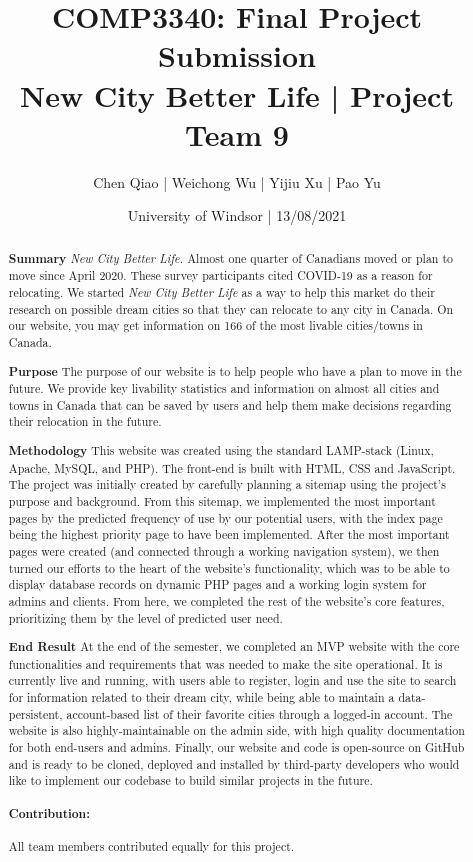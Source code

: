 \documentclass[12pt, letterpaper]{article}
\title{COMP3340: Final Project Submission \\{New City Better Life | Project Team 9}}
\author{Chen Qiao | Weichong Wu | Yijiu Xu | Pao Yu}
\date{University of Windsor | 13/08/2021}
\begin{document}
\maketitle

\begin{abstract}

    \textbf{Summary}
    \textit{New City Better Life.} Almost one quarter of Canadians moved or plan to move since April 2020. These survey participants cited COVID-19 as a reason for relocating. We started \textit{New City Better Life} as a way to help this market do their research on possible dream cities so that they can relocate to any city in Canada. On our website, you may get information on 166 of the most livable cities/towns in Canada.
    
    \textbf{Purpose}
    The purpose of our website is to help people who have a plan to move in the future. We provide key livability statistics and information on almost all cities and towns in Canada that can be saved by users and help them make decisions regarding their relocation in the future.
   
    \textbf{Methodology}
    This website was created using the standard LAMP-stack (Linux, Apache, MySQL, and PHP). The front-end is built with HTML, CSS and JavaScript. The project was initially created by carefully planning a sitemap using the project's purpose and background. From this sitemap, we implemented the most important pages by the predicted frequency of use by our potential users, with the index page being the highest priority page to have been implemented. After the most important pages were created (and connected through a working navigation system), we then turned our efforts to the heart of the website's functionality, which was to be able to display database records on dynamic PHP pages and a working login system for admins and clients. From here, we completed the rest of the website's core features, prioritizing them by the level of predicted user need.

    \textbf{End Result}
    At the end of the semester, we completed an MVP website with the core functionalities and requirements that was needed to make the site operational. It is currently live and running, with users able to register, login and use the site to search for information related to their dream city, while being able to maintain a data-persistent, account-based list of their favorite cities through a logged-in account. The website is also highly-maintainable on the admin side, with high quality documentation for both end-users and admins. Finally, our website and code is open-source on GitHub and is ready to be cloned, deployed and installed by third-party developers who would like to implement our codebase to build similar projects in the future.

\paragraph*{Contribution: } All team members contributed equally for this project.

\end{abstract}
\end{document}
